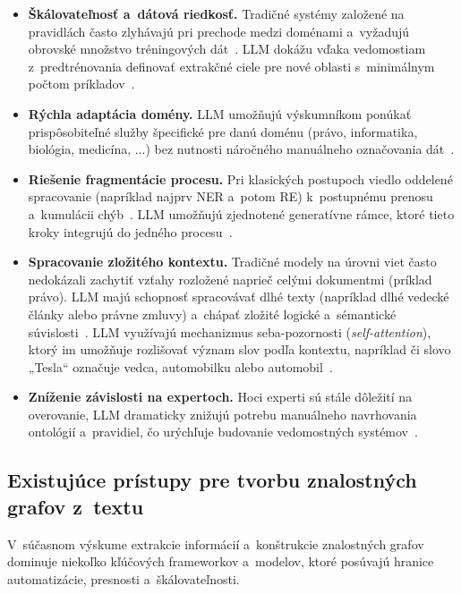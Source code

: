 \begin{itemize}
  \item \textbf{Škálovateľnosť a~dátová riedkosť.} Tradičné systémy založené na pravidlách často zlyhávajú pri prechode medzi doménami a~vyžadujú obrovské množstvo tréningových dát~\cite{llmEmpKGcons2025}. LLM dokážu vďaka vedomostiam z~predtrénovania definovať extrakčné ciele pre nové oblasti s~minimálnym počtom príkladov~\cite{IEtoSuppScien2025}.
  \item \textbf{Rýchla adaptácia domény.} LLM umožňujú výskumníkom ponúkať prispôsobiteľné služby špecifické pre danú doménu (právo, informatika, biológia, medicína, ...) bez nutnosti náročného manuálneho označovania dát~\cite{IEtoSuppScien2025}.
  \item \textbf{Riešenie fragmentácie procesu.} Pri klasických postupoch viedlo oddelené spracovanie (napríklad najprv NER a~potom RE) k~postupnému prenosu a~kumulácii chýb~\cite{autKGconstruction2023,llmEmpKGcons2025}. LLM umožňujú zjednotené generatívne rámce, ktoré tieto kroky integrujú do jedného procesu~\cite{llmEmpKGcons2025}.
  \item \textbf{Spracovanie zložitého kontextu.} Tradičné modely na úrovni viet často nedokázali zachytiť vzťahy rozložené naprieč celými dokumentmi (príklad právo). LLM majú schopnosť spracovávať dlhé texty (napríklad dlhé vedecké články alebo právne zmluvy) a~chápať zložité logické a~sémantické súvislosti~\cite{IEtoSuppScien2025,nlpLegal2025,autKGconstruction2023}. LLM využívajú mechanizmus seba-pozornosti (\textit{self-attention}), ktorý im umožňuje rozlišovať význam slov podľa kontextu, napríklad či slovo „Tesla“ označuje vedca, automobilku alebo automobil~\cite{nlpLegal2025}.
  \item \textbf{Zníženie závislosti na expertoch.} Hoci experti sú stále dôležití na overovanie, LLM dramaticky znižujú potrebu manuálneho navrhovania ontológií a~pravidiel, čo urýchľuje budovanie vedomostných systémov~\cite{llmEmpKGcons2025}.
\end{itemize} 



\subsection{Existujúce prístupy pre tvorbu znalostných grafov z~textu}

V~súčasnom výskume extrakcie informácií a~konštrukcie znalostných grafov dominuje niekoľko kľúčových frameworkov a~modelov, ktoré posúvajú hranice automatizácie, presnosti a~škálovateľnosti.

